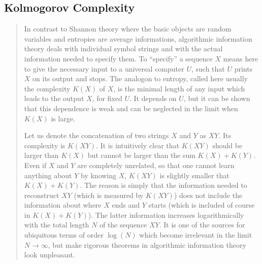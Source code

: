 \subsection{Kolmogorov Complexity}
\begin{quotation}
In contrast to Shannon theory where the basic objects are random variables and entropies are average informations, algorithmic information theory deals with individual symbol strings and with the actual information needed to specify them. 
To ``specify'' a sequence $X$ means here to give the necessary input to a universal computer $U$, such that $U$ prints $X$ on its output and stops. The analogon to entropy, called here usually the complexity $K(X)$ of $X$, is the minimal length of any input which leads to the output $X$, for fixed $U$. It depends on $U$, but it can be shown that this dependence is weak and can be neglected in the limit when $K(X)$ is large.

Let us denote the concatenation of two strings $X$ and $Y$ as $XY$. Its complexity is $K(XY)$. It is intuitively clear that $K(XY)$ should be larger than $K(X)$ but cannot be larger than the sum $K(X)+K(Y)$. Even if $X$ and $Y$ are completely unrelated, so that one cannot learn anything about $Y$ by knowing $X$, $K(XY)$ is slightly smaller that $K(X) + K(Y)$. The reason is simply that the information needed to reconstruct $XY$ (which is measured by $K(XY)$) does not include the information about where $X$ ends and $Y$ starts (which is included of course in $K(X) + K(Y)$). The latter information increases logarithmically with the total length $N$ of the sequence $XY$. It is one of the sources for ubiquitous terms of order $\log(N)$ which become irrelevant in the limit $N \rightarrow \infty$, but make rigorous theorems in algorithmic information theory look unpleasant.
\end{quotation}  